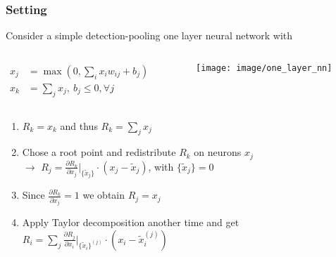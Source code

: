 \documentclass{beamer}
\begin{document}
\begin{frame}
\frametitle{Setting}
\vspace{0.5cm}
Consider a simple detection-pooling one layer neural network with
\vspace{-0.2cm}
 \begin{columns}
          \begin{column}[T]{5.5cm}
		\begin{align*}
		x_j &= \max(0, \sum_i x_iw_{ij} + b_j)\\
		x_k &= \sum_j x_j, \ b_j \leq 0, \forall j
		\end{align*}
            \end{column} 
            \begin{column}[T]{6.5cm}
			\begin{figure}
				\texttt{[image: image/one\_layer\_nn]}
			\end{figure}
	\end{column}
\end{columns} 
\vspace{0.25cm}
\begin{enumerate}
\item $R_k = x_k$ and thus $R_k = \sum_j x_j$
\item  Chose a root point and redistribute $R_k$ on neurons $x_j$\\
$\rightarrow$ $R_j = \frac{\partial R_k}{\partial x_j}\Big|_{\{\tilde{x}_j\}} \cdot (x_j - \tilde{x}_j) $, with $\{\tilde{x}_j\}=0$
\item Since $\frac{\partial R_k}{\partial x_j}=1$ we obtain $R_j = x_j$
\item Apply Taylor decomposition another time and get\\
 $R_i = \sum_j\frac{\partial R_j}{\partial x_i}\Big|_{\{\tilde{x}_i\}^{(j)}} \cdot (x_i - \tilde{x}_i^{(j)})$
\end{enumerate}



\end{frame}
\end{document}
